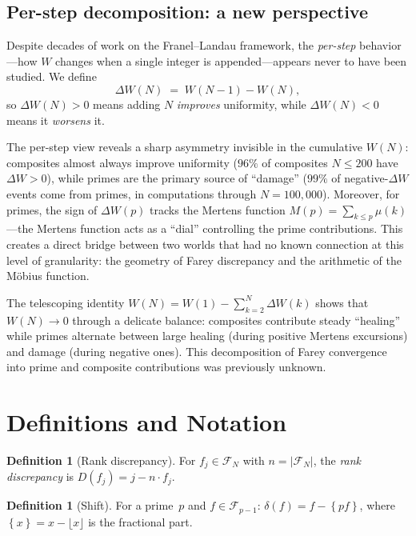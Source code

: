 \documentclass[11pt]{article}
\theoremstyle{definition}
\newtheorem{definition}[theorem]{Definition}
\newcommand{\F}{\mathcal{F}}
\newcommand{\fpart}[1]{\left\{#1\right\}}
\begin{document}
\subsection{Per-step decomposition: a new perspective}

Despite decades of work on the Franel--Landau framework, the
\emph{per-step} behavior---how $W$ changes when a single integer
is appended---appears never to have been studied.  We define
\begin{equation}\label{eq:delta-w}
  \Delta W(N) \;=\; W(N{-}1) - W(N),
\end{equation}
so $\Delta W(N) > 0$ means adding $N$ \emph{improves} uniformity,
while $\Delta W(N) < 0$ means it \emph{worsens} it.

The per-step view reveals a sharp asymmetry invisible in the
cumulative $W(N)$: composites almost always improve uniformity
($96\%$ of composites $N \le 200$ have $\Delta W > 0$), while
primes are the primary source of ``damage'' ($99\%$ of
negative-$\Delta W$ events come from primes, in computations
through $N = 100{,}000$).  Moreover, for
primes, the sign of $\Delta W(p)$ tracks the Mertens function
$M(p) = \sum_{k \le p} \mu(k)$---the Mertens function acts as
a ``dial'' controlling the prime contributions.  This creates
a direct bridge between two worlds that had no known connection
at this level of granularity: the geometry of Farey discrepancy
and the arithmetic of the M\"obius function.

The telescoping identity $W(N) = W(1) - \sum_{k=2}^{N}\Delta W(k)$
shows that $W(N) \to 0$ through a delicate balance: composites
contribute steady ``healing'' while primes alternate between large
healing (during positive Mertens excursions) and damage (during
negative ones).  This decomposition of Farey convergence into
prime and composite contributions was previously unknown.


\section{Definitions and Notation}\label{sec:defs}

\begin{definition}[Rank discrepancy]
For $f_j \in \F_N$ with $n = |\F_N|$, the \emph{rank discrepancy} is
$D(f_j) = j - n \cdot f_j$.
\end{definition}

\begin{definition}[Shift]
For a prime~$p$ and $f \in \F_{p-1}$:
$\delta(f) = f - \fpart{pf}$,
where $\fpart{x} = x - \lfloor x \rfloor$ is the fractional part.
\end{definition}
\end{document}
